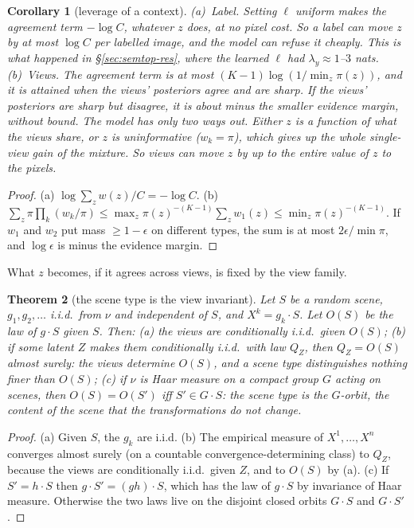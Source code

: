 \documentclass[11pt]{article}
\newtheorem{theorem}{Theorem}
\newtheorem{corollary}[theorem]{Corollary}
\theoremstyle{definition}
\begin{document}
\begin{corollary}[leverage of a context]\label{cor:leverage}
(a)~\emph{Label.} Setting $\ell$ uniform makes the agreement term $-\log C$, whatever $z$ does, at no pixel cost. So a label
can move $z$ by at most $\log C$ per labelled image, and the model can refuse it cheaply. This is what happened in
\S\ref{sec:semtop-res}, where the learned $\ell$ had $\lambda_y\approx1$--$3$ nats.
(b)~\emph{Views.} The agreement term is at most $(K-1)\log(1/\min_z\pi(z))$, and it is attained when the views' posteriors
agree and are sharp. If the views' posteriors are sharp but disagree, it is about minus the smaller evidence margin,
without bound. The model has only two ways out. Either $z$ is a function of what the views share, or $z$ is
uninformative ($w_k=\pi$), which gives up the whole single-view gain of the mixture. So views can move $z$ by up to the
entire value of $z$ to the pixels.
\end{corollary}
\begin{proof}
(a) $\log\sum_zw(z)/C=-\log C$. (b) $\sum_z\pi\prod_k(w_k/\pi)\le\max_z\pi(z)^{-(K-1)}\sum_zw_1(z)\le\min_z\pi(z)^{-(K-1)}$.
If $w_1$ and $w_2$ put mass $\ge1-\epsilon$ on different types, the sum is at most $2\epsilon/\min\pi$, and
$\log\epsilon$ is minus the evidence margin.
\end{proof}

\noindent What $z$ becomes, if it agrees across views, is fixed by the view family.

\begin{theorem}[the scene type is the view invariant]\label{thm:invariant}
Let $S$ be a random scene, $g_1,g_2,\dots$ i.i.d.\ from $\nu$ and independent of $S$, and $X^k=g_k\cdot S$. Let $O(S)$ be
the law of $g\cdot S$ given $S$. Then:
(a) the views are conditionally i.i.d.\ given $O(S)$;
(b) if some latent $Z$ makes them conditionally i.i.d.\ with law $Q_Z$, then $Q_Z=O(S)$ almost surely: the views
determine $O(S)$, and a scene type distinguishes nothing finer than $O(S)$;
(c) if $\nu$ is Haar measure on a compact group $G$ acting on scenes, then $O(S)=O(S')$ iff $S'\in G\cdot S$: the scene
type is the $G$-orbit, the content of the scene that the transformations do not change.
\end{theorem}
\begin{proof}
(a) Given $S$, the $g_k$ are i.i.d. (b) The empirical measure of $X^1,\dots,X^n$ converges almost surely (on a countable
convergence-determining class) to $Q_Z$, because the views are conditionally i.i.d.\ given $Z$, and to $O(S)$ by (a).
(c) If $S'=h\cdot S$ then $g\cdot S'=(gh)\cdot S$, which has the law of $g\cdot S$ by invariance of Haar measure.
Otherwise the two laws live on the disjoint closed orbits $G\cdot S$ and $G\cdot S'$.
\end{proof}
\end{document}
